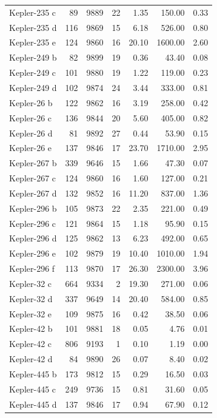 \begin{table}
\begin{tabular}{lrrrrrr}
Kepler-235 c & 89 & 9889 & 22 & 1.35 & 150.00 & 0.33 \\
Kepler-235 d & 116 & 9869 & 15 & 6.18 & 526.00 & 0.80 \\
Kepler-235 e & 124 & 9860 & 16 & 20.10 & 1600.00 & 2.60 \\
Kepler-249 b & 82 & 9899 & 19 & 0.36 & 43.40 & 0.08 \\
Kepler-249 c & 101 & 9880 & 19 & 1.22 & 119.00 & 0.23 \\
Kepler-249 d & 102 & 9874 & 24 & 3.44 & 333.00 & 0.81 \\
Kepler-26 b & 122 & 9862 & 16 & 3.19 & 258.00 & 0.42 \\
Kepler-26 c & 136 & 9844 & 20 & 5.60 & 405.00 & 0.82 \\
Kepler-26 d & 81 & 9892 & 27 & 0.44 & 53.90 & 0.15 \\
Kepler-26 e & 137 & 9846 & 17 & 23.70 & 1710.00 & 2.95 \\
Kepler-267 b & 339 & 9646 & 15 & 1.66 & 47.30 & 0.07 \\
Kepler-267 c & 124 & 9860 & 16 & 1.60 & 127.00 & 0.21 \\
Kepler-267 d & 132 & 9852 & 16 & 11.20 & 837.00 & 1.36 \\
Kepler-296 b & 105 & 9873 & 22 & 2.35 & 221.00 & 0.49 \\
Kepler-296 c & 121 & 9864 & 15 & 1.18 & 95.90 & 0.15 \\
Kepler-296 d & 125 & 9862 & 13 & 6.23 & 492.00 & 0.65 \\
Kepler-296 e & 102 & 9879 & 19 & 10.40 & 1010.00 & 1.94 \\
Kepler-296 f & 113 & 9870 & 17 & 26.30 & 2300.00 & 3.96 \\
Kepler-32 c & 664 & 9334 & 2 & 19.30 & 271.00 & 0.06 \\
Kepler-32 d & 337 & 9649 & 14 & 20.40 & 584.00 & 0.85 \\
Kepler-32 e & 109 & 9875 & 16 & 0.42 & 38.50 & 0.06 \\
Kepler-42 b & 101 & 9881 & 18 & 0.05 & 4.76 & 0.01 \\
Kepler-42 c & 806 & 9193 & 1 & 0.10 & 1.19 & 0.00 \\
Kepler-42 d & 84 & 9890 & 26 & 0.07 & 8.40 & 0.02 \\
Kepler-445 b & 173 & 9812 & 15 & 0.29 & 16.50 & 0.03 \\
Kepler-445 c & 249 & 9736 & 15 & 0.81 & 31.60 & 0.05 \\
Kepler-445 d & 137 & 9846 & 17 & 0.94 & 67.90 & 0.12 \\

\end{tabular}
\end{table}
